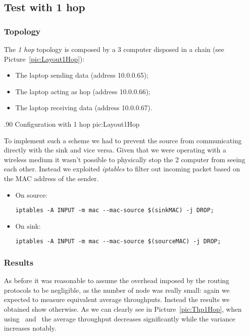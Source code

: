 \subsection{Test with 1 hop}
\subsubsection{Topology}
        The \emph{1 hop} topology is composed by a 3 computer disposed
        in a chain (see Picture~\ref{pic:Layout1Hop}):
        \begin{itemize}
        \item   The laptop sending data (address 10.0.0.65);
        \item   The laptop acting as hop (address 10.0.0.66);
        \item   The laptop receiving data (address 10.0.0.67).
        \end{itemize}

                {.90\columnwidth}
                {Configuration with 1 hop}
                {pic:Layout1Hop}

        To implement such a scheme we had to prevent the source
        from communicating directly with the sink and vice versa. Given
        that we were operating with a wireless medium it wasn't possible
        to physically stop the 2 computer from seeing each
        other. Instead we exploited \emph{iptables} to filter out incoming
        packet based on the MAC address of the sender.

        \begin{itemize}
        \item On source:
            \begin{verbatim}
iptables -A INPUT -m mac --mac-source $(sinkMAC) -j DROP;
            \end{verbatim}

        \item On sink:
            \begin{verbatim}
iptables -A INPUT -m mac --mac-source $(sourceMAC) -j DROP;
            \end{verbatim}

        \end{itemize}

\subsubsection{Results}
      As before it was reasonable to assume the overhead imposed by
      the routing protocols to be negligible, as the number of node was
      really small: again we expected to measure equivalent average
      throughputs. Instead the results we obtained show otherwise.
      As we can clearly see in  Picture~\ref{pic:Thp1Hop}, when using
      \batman\ and \olsr\, the average
      throughput decreases significantly while the variance increases notably.

